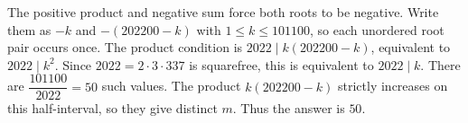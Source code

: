 The positive product and negative sum force both roots to be negative. Write them as $-k $ and $-(202200-k)$ with $ 1\le k\le101100 $, so each unordered root pair occurs once. The product condition is $ 2022\mid k(202200-k)$, equivalent to $ 2022\mid k^2 $. Since $ 2022=2\cdot3\cdot337 $ is squarefree, this is equivalent to $ 2022\mid k $. There are $\dfrac{101100}{2022}=50 $ such values. The product $ k(202200-k)$ strictly increases on this half-interval, so they give distinct $ m $. Thus the answer is $\boxed{50}$.
